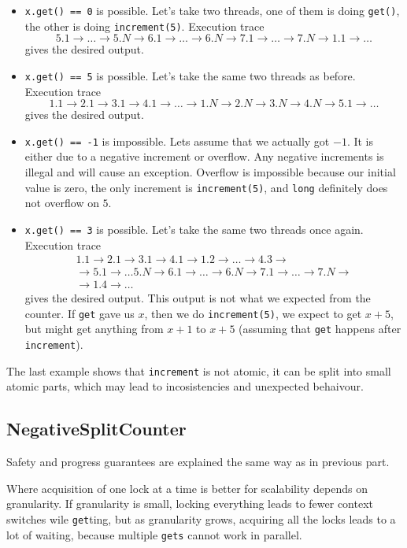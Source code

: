 \documentclass[a4paper,12pt]{article}
\begin{document}
\begin{itemize}
\item \verb|x.get() == 0| is possible. Let's take two threads, one of them is doing \verb|get()|, the other is doing \verb|increment(5)|. Execution trace \[ 5.1 \to \dots \to 5.N \to 6.1 \to \dots \to 6.N \to 7.1 \to \dots \to 7.N \to 1.1 \to \dots \] gives the desired output.
\item \verb|x.get() == 5| is possible. Let's take the same two threads as before. Execution trace
\[ 1.1 \to 2.1 \to 3.1 \to 4.1 \to \dots \to 1.N \to 2.N \to 3.N \to 4.N \to 5.1 \to \dots \] gives the desired output.
\item \verb|x.get() == -1| is impossible. Lets assume that we actually got $-1$. It is either due to a negative increment or overflow. Any negative increments is illegal and will cause an exception. Overflow is impossible because our initial value is zero, the only increment is \verb|increment(5)|, and \verb|long| definitely does not overflow on $5$.
\item \verb|x.get() == 3| is possible. Let's take the same two threads once again. Execution trace
\begin{multline*}
1.1 \to 2.1 \to 3.1 \to 4.1 \to 1.2 \to \dots \to 4.3 \to \\
\to 5.1 \to \dots 5.N \to 6.1 \to \dots \to 6.N \to 7.1 \to \dots \to 7.N \to \\
\to 1.4 \to \dots
\end{multline*} gives the desired output. This output is not what we expected from the counter. If \verb|get| gave us $x$, then we do \verb|increment(5)|, we expect to get $x + 5$, but might get anything from $x + 1$ to $x + 5$ (assuming that \verb|get| happens after \verb|increment|).
\end{itemize}

The last example shows that \verb|increment| is not atomic, it can be split into small atomic parts, which may lead to incosistencies and unexpected behaivour.

\subsection*{NegativeSplitCounter}

Safety and progress guarantees are explained the same way as in previous part.

Where acquisition of one lock at a time is better for scalability depends on granularity. If granularity is small, locking everything leads to fewer context switches wile \verb|get|ting, but as granularity grows, acquiring all the locks leads to a lot of waiting, because multiple \verb|gets| cannot work in parallel.
\end{document}
